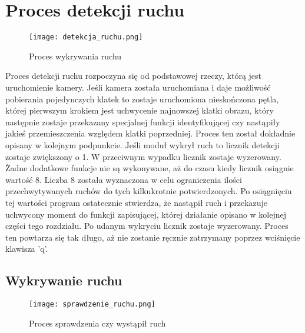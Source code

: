 \section{Proces detekcji ruchu}
\begin{figure}[H]
	\centering
	\texttt{[image: detekcja\_ruchu.png]}
	\caption{Proces wykrywania ruchu}
	\label{fig:proces_detekcji}
\end{figure}
Proces detekcji ruchu rozpoczyna się od podstawowej rzeczy, którą jest uruchomienie kamery. Jeśli kamera została uruchomiana i daje możliwość pobierania pojedynczych klatek to zostaje uruchomiona nieskończona pętla, której pierwszym krokiem jest uchwycenie najnowszej klatki obrazu, który następnie zostaje przekazany specjalnej funkcji identyfikującej czy nastąpiły jakieś przemieszczenia względem klatki poprzedniej. Proces ten został dokładnie opisany w kolejnym podpunkcie. Jeśli moduł wykrył ruch to licznik detekcji zostaje zwiększony o 1. W przeciwnym wypadku licznik zostaje wyzerowany. Żadne dodatkowe funkcje nie są wykonywane, aż do czasu kiedy licznik osiągnie wartość 8. Liczba 8 została wyznaczona w celu ograniczenia ilości przechwytywanych ruchów do tych kilkukrotnie potwierdzonych. Po osiągnięciu tej wartości program ostatecznie stwierdza, że nastąpił ruch i przekazuje uchwycony moment do funkcji zapisującej, której działanie opisano w kolejnej części tego rozdziału. Po udanym wykryciu licznik zostaje wyzerowany. Proces ten powtarza się tak długo, aż nie zostanie ręcznie zatrzymany poprzez wciśnięcie klawisza 'q'.

\subsection{Wykrywanie ruchu}
\begin{figure}[H]
	\centering
	\texttt{[image: sprawdzenie\_ruchu.png]}
	\caption{Proces sprawdzenia czy wystąpił ruch}
	\label{fig:wykrywanie)ruchu}
\end{figure}